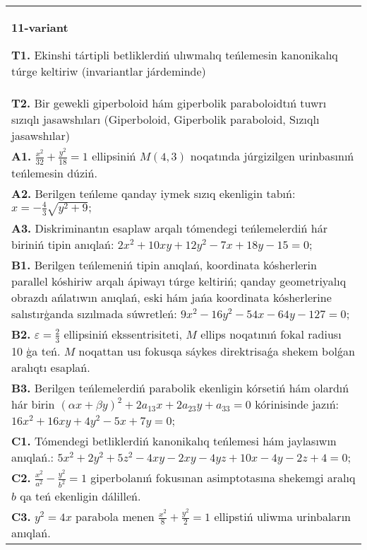 \documentclass{article}
\begin{document}
\begin{tabular}{m{17cm}}
\textbf{11-variant}
\newline

\textbf{T1.} Ekinshi tártipli betliklerdiń ulıwmalıq teńlemesin kanonikalıq túrge keltiriw (invariantlar járdeminde) \\
\textbf{T2.} Bir gewekli giperboloid hám giperbolik paraboloidtıń tuwrı sızıqlı jasawshıları (Giperboloid, Giperbolik paraboloid, Sızıqlı jasawshılar) \\
\textbf{A1.} $\frac{x^2}{32}+\frac{y^2}{18}=1$ ellipsiniń $M (4,3) $ noqatında júrgizilgen urinbasınıń teńlemesin dúziń. \\
\textbf{A2.} Berilgen teńleme qanday iymek sızıq ekenligin tabıń: $x=-\frac{4}{3} \sqrt{y^2+9} ;$ \\
\textbf{A3.} Diskriminantın esaplaw arqalı tómendegi teńlemelerdiń hár biriniń tipin anıqlań: $2 x^2+10 x y+12 y^2-7 x+18 y-15=0$; \\
\textbf{B1.} Berilgen teńlemeniń tipin anıqlań, koordinata kósherlerin parallel kóshiriw arqalı ápiwayı túrge keltiriń; qanday geometriyalıq obrazdı ańlatıwın anıqlań, eski hám jańa koordinata kósherlerine salıstırģanda sızılmada súwretleń: $9 x^2-16 y^2-54 x-64 y-127=0$; \\
\textbf{B2.} $\varepsilon=\frac{2}{3}$ ellipsiniń ekssentrisiteti, $M$ ellips noqatınıń fokal radiusı 10 ģa teń. $M$ noqattan usı fokusqa sáykes direktrisaǵa shekem bolǵan aralıqtı esaplań. \\
\textbf{B3.} Berilgen teńlemelerdiń parabolik ekenligin kórsetiń hám olardıń hár birin $(\alpha x+\beta y)^2+2 a_{13} x+2 a_{23} y+a_{33}=0$ kórinisinde jazıń:  $16 x^2+16 x y+4 y^2-5 x+7 y=0$; \\
\textbf{C1.} Tómendegi betliklerdiń kanonikalıq teńlemesi hám jaylasıwın anıqlań.: $5 x^2+2 y^2+5 z^2-4 x y-2 x y-4 y z+10 x-4 y-2 z+4=0$; \\
\textbf{C2.} $\frac{x^2}{a^2}-\frac{y^2}{b^2}=1$ giperbolanıń fokusınan asimptotasına shekemgi aralıq $b$ qa teń ekenligin dálilleń. \\
\textbf{C3.} $y^2=4 x$ parabola menen $\frac{x^2}{8}+\frac{y^2}{2}=1$ ellipstiń uliwma urinbaların anıqlań. \\

\end{tabular}
\vspace{1cm}
\end{document}
